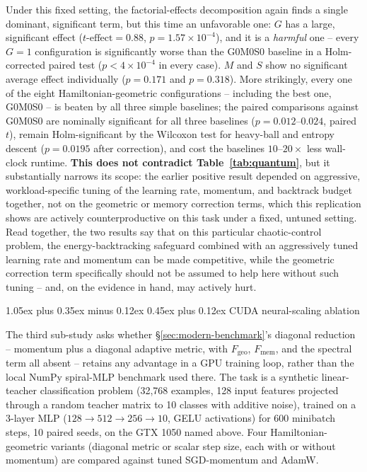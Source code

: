\documentclass[10pt,twocolumn]{article}
\makeatletter
\renewcommand\subsection{\@startsection{subsection}{2}{0pt}%
  {1.05ex plus 0.35ex minus 0.12ex}%
  {0.45ex plus 0.12ex}%
  {\normalsize\bfseries}}
\makeatother
\begin{document}
Under this fixed setting, the factorial-effects decomposition again finds a
single dominant, significant term, but this time an unfavorable one: $G$ has
a large, significant effect ($t\text{-effect}=0.88$, $p=1.57\times10^{-4}$),
and it is a \emph{harmful} one -- every $G{=}1$ configuration is significantly
worse than the G0M0S0 baseline in a Holm-corrected paired test
($p<4\times10^{-4}$ in every case). $M$ and $S$ show no significant average
effect individually ($p=0.171$ and $p=0.318$). More strikingly, every one of
the eight Hamiltonian-geometric configurations -- including the best one,
G0M0S0 -- is beaten by all three simple baselines; the paired comparisons
against G0M0S0 are nominally significant for all three baselines
($p=0.012$--$0.024$, paired $t$), remain Holm-significant by the Wilcoxon
test for heavy-ball and entropy descent ($p=0.0195$ after correction), and
cost the baselines $10$--$20\times$ less wall-clock runtime. \textbf{This
does not contradict Table~\ref{tab:quantum}}, but it substantially narrows
its scope: the earlier positive result depended on aggressive,
workload-specific tuning of the learning rate, momentum, and backtrack
budget together, not on the geometric or memory correction terms, which this
replication shows are actively counterproductive on this task under a fixed,
untuned setting. Read together, the two results say that on this particular
chaotic-control problem, the energy-backtracking safeguard combined with an
aggressively tuned learning rate and momentum can be made competitive, while
the geometric correction term specifically should not be assumed to help
here without such tuning -- and, on the evidence in hand, may actively hurt.

\subsection{CUDA neural-scaling ablation}
\label{sec:ext-gpu}

The third sub-study asks whether \S\ref{sec:modern-benchmark}'s diagonal
reduction -- momentum plus a diagonal adaptive metric, with
$F_{\mathrm{geo}}$, $F_{\mathrm{mem}}$, and the spectral term all absent --
retains any advantage in a GPU training loop, rather than the local NumPy
spiral-MLP benchmark used there. The task is a synthetic linear-teacher
classification problem (32{,}768 examples, 128 input features projected
through a random teacher matrix to 10 classes with additive noise), trained
on a 3-layer MLP ($128\to512\to256\to10$, GELU activations) for 600
minibatch steps, 10 paired seeds, on the GTX 1050 named above. Four
Hamiltonian-geometric variants (diagonal metric or scalar step size, each
with or without momentum) are compared against tuned SGD-momentum and AdamW.
\end{document}
